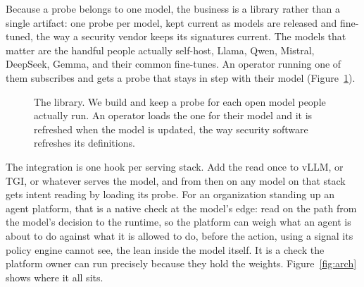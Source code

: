 \documentclass[11pt]{article}
\begin{document}
Because a probe belongs to one model, the business is a library rather than a single artifact: one
probe per model, kept current as models are released and fine-tuned, the way a security vendor keeps
its signatures current. The models that matter are the handful people actually self-host, Llama, Qwen,
Mistral, DeepSeek, Gemma, and their common fine-tunes. An operator running one of them subscribes and
gets a probe that stays in step with their model (Figure~\ref{fig:library}).

\begin{figure}[htbp]\centering
{}
\caption{The library. We build and keep a probe for each open model people actually run. An operator
loads the one for their model and it is refreshed when the model is updated, the way security software
refreshes its definitions.}\label{fig:library}
\end{figure}

The integration is one hook per serving stack. Add the read once to vLLM, or TGI, or whatever serves
the model, and from then on any model on that stack gets intent reading by loading its probe. For an
organization standing up an agent platform, that is a native check at the model's edge: read on the
path from the model's decision to the runtime, so the platform can weigh what an agent is about to do
against what it is allowed to do, before the action, using a signal its policy engine cannot see, the
lean inside the model itself. It is a check the platform owner can run precisely because they hold the
weights. Figure~\ref{fig:arch} shows where it all sits.
\end{document}
